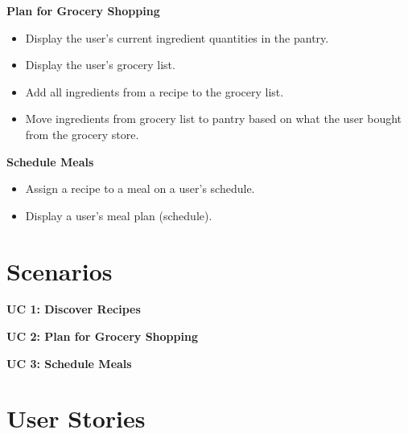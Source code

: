 \documentclass[11pt, letterpaper]{report}
\begin{document}
\noindent \textbf{Plan for Grocery Shopping}
\begin{itemize}
    \item Display the user’s current ingredient quantities in the pantry.
    \item Display the user’s grocery list.
    \item Add all ingredients from a recipe to the grocery list.
    \item Move ingredients from grocery list to pantry based on what the user bought from the grocery store.
\end{itemize}

\noindent \textbf{Schedule Meals}
\begin{itemize}
    \item Assign a recipe to a meal on a user’s schedule.
    \item Display a user’s meal plan (schedule).
\end{itemize}

\chapter{Scenarios}
\noindent \textbf{UC 1: Discover Recipes} \\
\lipsum[1]

\noindent \textbf{UC 2: Plan for Grocery Shopping} \\
\lipsum[1]

\noindent \textbf{UC 3: Schedule Meals} \\
\lipsum[1]

\chapter{User Stories}
\end{document}
